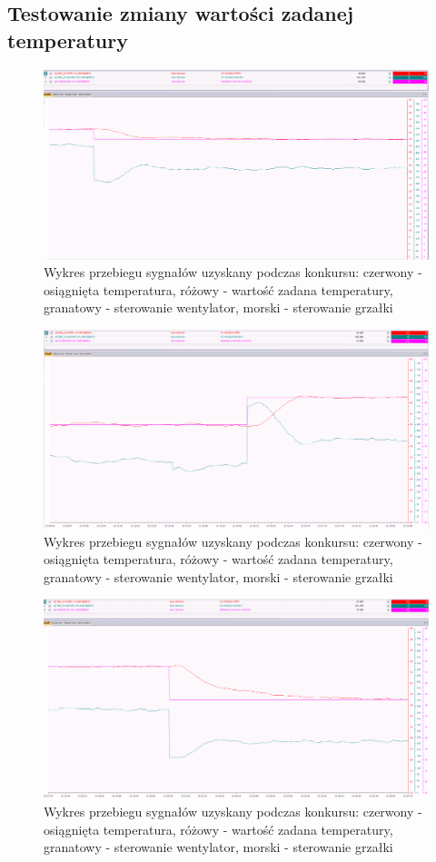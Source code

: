 \documentclass[12pt, a4paper]{article}
\begin{document}
\subsection{Testowanie zmiany wartości zadanej temperatury}

\begin{figure}[H]
	\centering
	\includegraphics[width=0.9\linewidth]{SKOK_STEROWANIA}
	\caption{Wykres przebiegu sygnałów uzyskany podczas konkursu: czerwony - osiągnięta temperatura, różowy - wartość zadana temperatury, granatowy - sterowanie wentylator, morski - sterowanie  grzałki}
	\label{fig:SKOK_STEROWANIA}
\end{figure}
\begin{figure}[H]
	\centering
	\includegraphics[width=0.9\linewidth]{sterowanie3843}
	\caption{Wykres przebiegu sygnałów uzyskany podczas konkursu: czerwony - osiągnięta temperatura, różowy - wartość zadana temperatury, granatowy - sterowanie wentylator, morski - sterowanie  grzałki}
	\label{fig:sterowanie3843}
\end{figure}
\begin{figure}[H]
	\centering
	\includegraphics[width=0.9\linewidth]{sterowanie4337}
	\caption{Wykres przebiegu sygnałów uzyskany podczas konkursu: czerwony - osiągnięta temperatura, różowy - wartość zadana temperatury, granatowy - sterowanie wentylator, morski - sterowanie  grzałki}
	\label{fig:sterowanie4337}
\end{figure}
\end{document}
